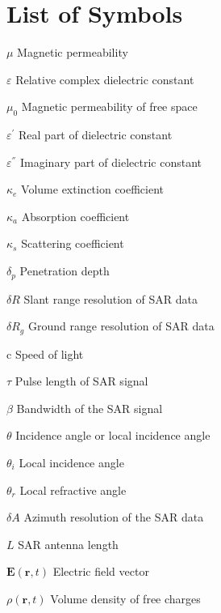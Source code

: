 \chapter*{List of Symbols}
\makeatletter
\makeatother
\newenvironment{symbols}{\begin{list}{}{\renewcommand{\makelabel}{\abbrlabel}
                                              \setlength{\itemsep}{0pt}}}{\end{list}}
\begin{symbols}
\item[$\mu$] 	Magnetic permeability
\item[$\varepsilon$] Relative complex dielectric constant
\item[$\mu_0$]	Magnetic permeability of free space
\item[$\varepsilon^{'}$]  Real part of dielectric constant  
\item[$\varepsilon^{''}$] Imaginary part of dielectric constant
\item[$\kappa_e$] Volume extinction coefficient
\item[$\kappa_{a}$] Absorption coefficient
\item[$\kappa_{s}$]	Scattering coefficient
\item[$\delta_{p}$] Penetration depth
\item[$\delta R$]   Slant range resolution of SAR data
\item[$\delta R_g$]  Ground range resolution of SAR data
\item[$\mbox{c}$]	Speed of light
\item[$\tau$] Pulse length of SAR signal
\item[$\beta$]  Bandwidth of the SAR signal
\item[$\theta$ ] 	Incidence angle or local incidence angle
\item[$\theta_{i}$] 	Local incidence angle
\item[$\theta_{r}$]  Local refractive angle 
\item[$\delta A$]	Azimuth resolution of the SAR data
\item[$L$]    SAR antenna length
\item[$\mathbf{E}(\mathbf{r},t)$] Electric field vector
\item[$\rho(\mathbf{r}, t)$] Volume density of free charges

\end{symbols}
